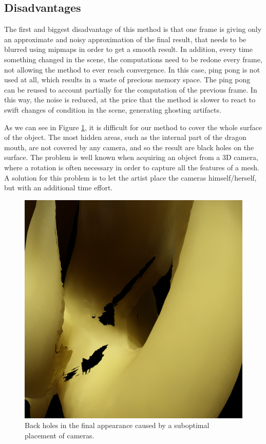 \subsection{Disadvantages}
The first and biggest disadvantage of this method is that one frame is giving only an approximate and noisy approximation of the final result, that needs to be blurred using mipmaps in order to get a smooth result. In addition, every time something changed in the scene, the computations need to be redone every frame, not allowing the method to ever reach convergence. In this case, ping pong is not used at all, which results in a waste of precious memory space. The ping pong can be reused to account partially for the computation of the previous frame. In this way, the noise is reduced, at the price that the method is slower to react to swift changes of condition in the scene, generating ghosting artifacts.

As we can see in Figure \ref{fig:tearing}, it is difficult for our method to cover the whole surface of the object. The most hidden areas, such as the internal part of the dragon mouth, are not covered by any camera, and so the result are black holes on the surface. The problem is well known when acquiring an object from a 3D camera, where a rotation is often necessary in order to capture all the features of a mesh. A solution for this problem is to let the artist place the cameras himself/herself, but with an additional time effort. 

\begin{figure}
\centering

\includegraphics[width=0.7 \linewidth]{images/results/tearing.png}
\caption{Back holes in the final appearance caused by a suboptimal placement of cameras.}
\label{fig:tearing}
\end{figure}


